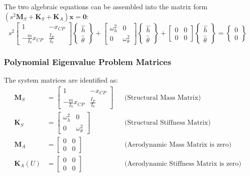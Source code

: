 \documentclass{article}
\begin{document}
The two algebraic equations can be assembled into the matrix form $(s^2\mathbf{M}_S + \mathbf{K}_S + \mathbf{K}_A)\mathbf{x} = \mathbf{0}$:
\begin{equation*}
    s^2
    \begin{bmatrix}
        1 & -x_{CP} \\
        -\frac{m}{I_0}x_{CP} & \frac{I_P}{I_0}
    \end{bmatrix}
    \begin{Bmatrix} \hat{h} \\ \hat{\theta} \end{Bmatrix}
    +
    \begin{bmatrix}
        \omega_h^2 & 0 \\
        0 & \omega_\theta^2
    \end{bmatrix}
    \begin{Bmatrix} \hat{h} \\ \hat{\theta} \end{Bmatrix}
    +
    \begin{bmatrix}
        0 & 0 \\
        0 & 0
    \end{bmatrix}
    \begin{Bmatrix} \hat{h} \\ \hat{\theta} \end{Bmatrix}
    =
    \begin{Bmatrix} 0 \\ 0 \end{Bmatrix}
\end{equation*}

\subsubsection*{Polynomial Eigenvalue Problem Matrices}
The system matrices are identified as:
\begin{align*}
    \mathbf{M}_S &=
    \begin{bmatrix}
        1 & -x_{CP} \\
        -\frac{m}{I_0}x_{CP} & \frac{I_P}{I_0}
    \end{bmatrix} && \text{(Structural Mass Matrix)} \\
    \mathbf{K}_S &=
    \begin{bmatrix}
        \omega_h^2 & 0 \\
        0 & \omega_\theta^2
    \end{bmatrix} && \text{(Structural Stiffness Matrix)} \\
    \mathbf{M}_A &=
    \begin{bmatrix}
        0 & 0 \\
        0 & 0
    \end{bmatrix} && \text{(Aerodynamic Mass Matrix is zero)} \\
    \mathbf{K}_A(U) &=
    \begin{bmatrix}
        0 & 0 \\
        0 & 0
    \end{bmatrix} && \text{(Aerodynamic Stiffness Matrix is zero)}
\end{align*}
\end{document}
